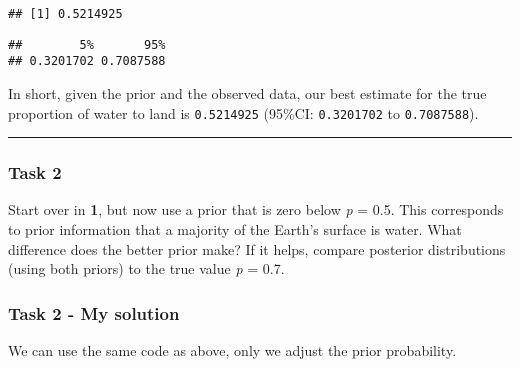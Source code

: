 \documentclass[]{article}
\newenvironment{Shaded}{\begin{snugshade}}{\end{snugshade}}
\newcommand{\CommentTok}[1]{\textcolor[rgb]{0.56,0.35,0.01}{\textit{#1}}}
\newcommand{\DataTypeTok}[1]{\textcolor[rgb]{0.13,0.29,0.53}{#1}}
\newcommand{\FloatTok}[1]{\textcolor[rgb]{0.00,0.00,0.81}{#1}}
\newcommand{\KeywordTok}[1]{\textcolor[rgb]{0.13,0.29,0.53}{\textbf{#1}}}
\newcommand{\NormalTok}[1]{#1}
\begin{document}
\begin{verbatim}
## [1] 0.5214925
\end{verbatim}

\begin{Shaded}
\end{Shaded}

\begin{verbatim}
##        5%       95% 
## 0.3201702 0.7087588
\end{verbatim}

In short, given the prior and the observed data, our best estimate for
the true proportion of water to land is \texttt{0.5214925} (95\%CI:
\texttt{0.3201702} to \texttt{0.7087588}).

\begin{center}\rule{0.5\linewidth}{\linethickness}\end{center}

\hypertarget{task-2}{%
\subsubsection{Task 2}\label{task-2}}

Start over in \textbf{1}, but now use a prior that is zero below
\emph{p} = 0.5. This corresponds to prior information that a majority of
the Earth's surface is water. What difference does the better prior
make? If it helps, compare posterior distributions (using both priors)
to the true value \emph{p} = 0.7.

\hypertarget{task-2---my-solution}{%
\subsubsection{Task 2 - My solution}\label{task-2---my-solution}}

We can use the same code as above, only we adjust the prior probability.
\end{document}
